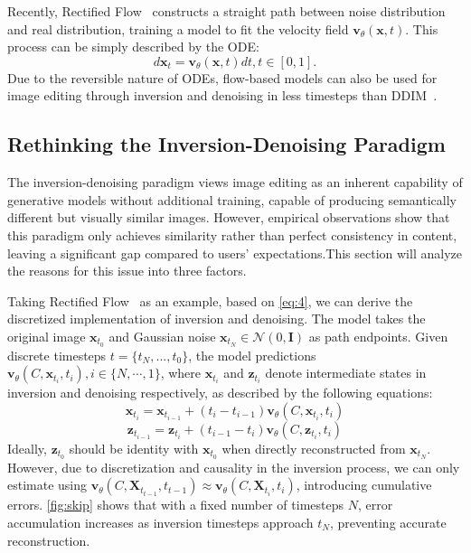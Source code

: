 Recently, Rectified Flow~\cite{liu2022rectified,rectflow} constructs a straight path between noise distribution and real distribution, training a model to fit the velocity field $\mathbf{v}_\theta(\mathbf{x},t)$. This process can be simply described by the ODE:
\begin{equation}
d\mathbf{x}_t=\mathbf{v}_\theta(\mathbf{x},t)dt,t\in[0,1].
\label{eq:4}
\end{equation}
Due to the reversible nature of ODEs, flow-based models can also be used for image editing through inversion and denoising in less timesteps than DDIM~\cite{ddim}.


\subsection{Rethinking the Inversion-Denoising Paradigm}
\label{sec:Rethinking}
The inversion-denoising paradigm views image editing as an inherent capability of generative models without additional training, capable of producing semantically different but visually similar images. However, empirical observations show that this paradigm only achieves similarity rather than perfect consistency in content, leaving a significant gap compared to users' expectations.This section will analyze the reasons for this issue into three factors.

Taking Rectified Flow~\cite{liu2022rectified,rectflow} as an example, based on \cref{eq:4}, we can derive the discretized implementation of inversion and denoising. The model takes the original image $\mathbf{x}_{t_0}$ and Gaussian noise $\mathbf{x}_{t_N}\in\mathcal{N}(0,\boldsymbol{I})$ as path endpoints. Given discrete timesteps $t=\{t_{N},...,t_{0}\}$, the model predictions $\boldsymbol{v}_\theta(C,\mathbf{x}_{t_i},t_i),i\in\{N,\cdots,1\}$, where $\mathbf{x}_{t_i}$ and $\mathbf{z}_{t_i}$ denote intermediate states in inversion and denoising respectively, as described by the following equations:
\begin{equation}
\mathbf{x}_{t_{i}}=\mathbf{x}_{t_{i-1}}+(t_i-t_{i-1})\boldsymbol{v}_\theta(C,\mathbf{x}_{t_i},t_i)
\end{equation}
\begin{equation}
\mathbf{z}_{t_{i-1}}=\mathbf{z}_{t_i}+(t_{i-1}-t_i)\boldsymbol{v}_\theta(C,\mathbf{z}_{t_i},t_i) 
\end{equation}
Ideally, $\mathbf{z}_{t_0}$ should be identity with $\mathbf{x}_{t_0}$ when directly reconstructed from $\mathbf{x}_{t_N}$. However, due to discretization and causality in the inversion process, we can only estimate using $\boldsymbol{v}_\theta(C,\mathbf{X}_{t_{t-1}},t_{t-1}) \approx \boldsymbol{v}_\theta(C,\mathbf{X}_{t_i},t_i)$, introducing cumulative errors. \cref{fig:skip} shows that with a fixed number of timesteps $N$, error accumulation increases as inversion timesteps approach $t_{N}$, preventing accurate reconstruction.

